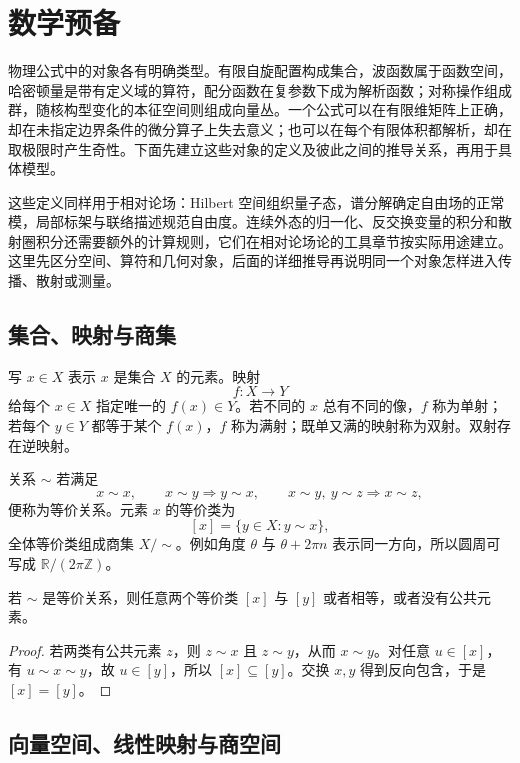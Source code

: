 \chapter{数学预备}
\label{chap:advanced-mathematical-foundations}

物理公式中的对象各有明确类型。有限自旋配置构成集合，波函数属于函数空间，哈密顿量是带有定义域的算符，配分函数在复参数下成为解析函数；对称操作组成群，随核构型变化的本征空间则组成向量丛。一个公式可以在有限维矩阵上正确，却在未指定边界条件的微分算子上失去意义；也可以在每个有限体积都解析，却在取极限时产生奇性。下面先建立这些对象的定义及彼此之间的推导关系，再用于具体模型。

这些定义同样用于相对论场：Hilbert 空间组织量子态，谱分解确定自由场的正常模，局部标架与联络描述规范自由度。连续外态的归一化、反交换变量的积分和散射圈积分还需要额外的计算规则，它们在相对论场论的工具章节按实际用途建立。这里先区分空间、算符和几何对象，后面的详细推导再说明同一个对象怎样进入传播、散射或测量。

\section{集合、映射与商集}

写 \(x\in X\) 表示 \(x\) 是集合 \(X\) 的元素。映射
\[
f:X\longrightarrow Y
\]
给每个 \(x\in X\) 指定唯一的 \(f(x)\in Y\)。若不同的 \(x\) 总有不同的像，\(f\) 称为单射；若每个 \(y\in Y\) 都等于某个 \(f(x)\)，\(f\) 称为满射；既单又满的映射称为双射。双射存在逆映射。

关系 \(\sim\) 若满足
\[
x\sim x,\qquad
x\sim y\Rightarrow y\sim x,\qquad
x\sim y,\ y\sim z\Rightarrow x\sim z,
\]
便称为等价关系。元素 \(x\) 的等价类为
\[
[x]=\{y\in X:y\sim x\},
\]
全体等价类组成商集 \(X/{\sim}\)。例如角度 \(\theta\) 与
\(\theta+2\pi n\) 表示同一方向，所以圆周可写成
\(\mathbb R/(2\pi\mathbb Z)\)。

\begin{proposition}
若 \(\sim\) 是等价关系，则任意两个等价类 \([x]\) 与 \([y]\) 或者相等，或者没有公共元素。
\end{proposition}

\begin{proof}
若两类有公共元素 \(z\)，则 \(z\sim x\) 且 \(z\sim y\)，从而
\(x\sim y\)。对任意 \(u\in[x]\)，有 \(u\sim x\sim y\)，故
\(u\in[y]\)，所以 \([x]\subseteq[y]\)。交换 \(x,y\) 得到反向包含，于是 \([x]=[y]\)。
\end{proof}

\section{向量空间、线性映射与商空间}

